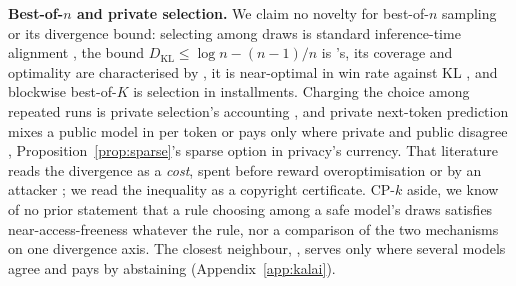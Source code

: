 \textbf{Best-of-$n$ and private selection.} We claim no novelty for best-of-$n$ sampling or its divergence
bound: selecting among draws is standard inference-time alignment
\citep{gao2023scaling,mudgal2024controlled,wang2023selfconsistency}, the bound
$D_{\mathrm{KL}} \le \log n - (n-1)/n$ is \citet{beirami2025bestofn}'s, its coverage and optimality are
characterised by \citet{huang2025bestofn}, it is near-optimal in win rate against KL
\citep{gui2024bonbon,yang2024asymptotics}, and blockwise best-of-$K$ \citep{mudgal2024controlled} is
selection in installments. Charging the choice among repeated runs is private selection's accounting
\citep{liu2019private,papernot2022hyperparameter}, and private next-token prediction mixes a public model in
per token \citep{ginart2022submix,flemings2024pmixed,majmudar2022dpdecoding} or pays only where private and
public disagree \citep{amin2024private}, Proposition~\ref{prop:sparse}'s sparse option in privacy's currency. That
literature reads the divergence as a \emph{cost}, spent before reward overoptimisation or by an attacker
\citep{hughes2024bestofn}; we read the inequality as a copyright certificate. CP-$k$ aside, we know
of no prior statement that a rule choosing among a safe model's draws satisfies near-access-freeness
whatever the rule, nor a comparison of the two mechanisms on one divergence axis. The closest neighbour,
\citet{kalai2026consensus}, serves only where several models agree and pays by abstaining
(Appendix~\ref{app:kalai}).
